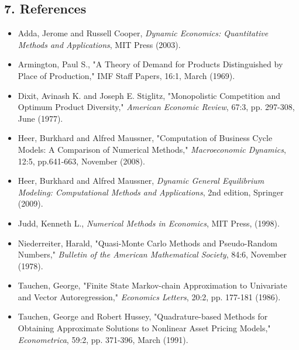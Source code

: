 \documentclass[11pt]{article}
\providecommand{\tightlist}{%
      \setlength{\itemsep}{0pt}\setlength{\parskip}{0pt}}
\begin{document}
    \subsection{7. References}\label{references}

\begin{itemize}
\tightlist
\item
  Adda, Jerome and Russell Cooper, \emph{Dynamic Economics: Quantitative
  Methods and Applications}, MIT Press (2003).
\item
  Armington, Paul S., "A Theory of Demand for Products Distinguished by
  Place of Production," IMF Staff Papers, 16:1, March (1969).
\item
  Dixit, Avinash K. and Joseph E. Stiglitz, "Monopolistic Competition
  and Optimum Product Diversity," \emph{American Economic Review}, 67:3,
  pp. 297-308, June (1977).
\item
  Heer, Burkhard and Alfred Maussner, "Computation of Business Cycle
  Models: A Comparison of Numerical Methods," \emph{Macroeconomic
  Dynamics}, 12:5, pp.641-663, November (2008).
\item
  Heer, Burkhard and Alfred Maussner, \emph{Dynamic General Equilibrium
  Modeling: Computational Methods and Applications}, 2nd edition,
  Springer (2009).
\item
  Judd, Kenneth L., \emph{Numerical Methods in Economics}, MIT Press,
  (1998).
\item
  Niederreiter, Harald, "Quasi-Monte Carlo Methods and Pseudo-Random
  Numbers," \emph{Bulletin of the American Mathematical Society}, 84:6,
  November (1978).
\item
  Tauchen, George, "Finite State Markov-chain Approximation to
  Univariate and Vector Autoregression," \emph{Economics Letters}, 20:2,
  pp. 177-181 (1986).
\item
  Tauchen, George and Robert Hussey, "Quadrature-based Methods for
  Obtaining Approximate Solutions to Nonlinear Asset Pricing Models,"
  \emph{Econometrica}, 59:2, pp. 371-396, March (1991).
\end{itemize}


    
    
    
    
\end{document}

